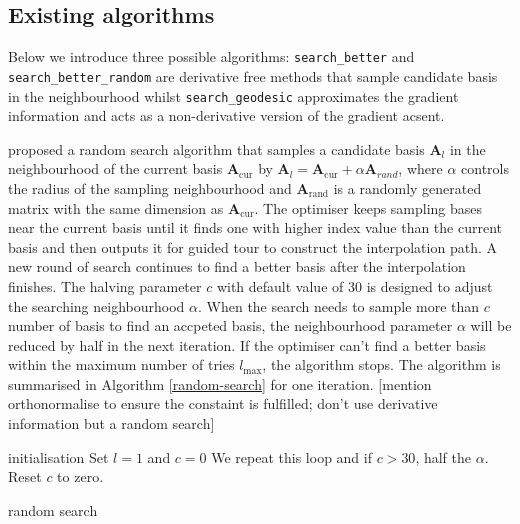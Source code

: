 \documentclass[12pt]{article}
\begin{document}
\newpage

\hypertarget{existing-algorithms}{%
\subsection{Existing algorithms}\label{existing-algorithms}}

Below we introduce three possible algorithms: \texttt{search\_better}
and \texttt{search\_better\_random} are derivative free methods that
sample candidate basis in the neighbourhood whilst
\texttt{search\_geodesic} approximates the gradient information and acts
as a non-derivative version of the gradient acsent.

\citet{posse1995projection} proposed a random search algorithm that
samples a candidate basis \(\mathbf{A}_{l}\) in the neighbourhood of the
current basis \(\mathbf{A}_{\text{cur}}\) by
\(\mathbf{A}_{l} = \mathbf{A}_{\text{cur}} + \alpha \mathbf{A}_{rand}\),
where \(\alpha\) controls the radius of the sampling neighbourhood and
\(\mathbf{A}_{\text{rand}}\) is a randomly generated matrix with the
same dimension as \(\mathbf{A}_{\text{cur}}\). The optimiser keeps
sampling bases near the current basis until it finds one with higher
index value than the current basis and then outputs it for guided tour
to construct the interpolation path. A new round of search continues to
find a better basis after the interpolation finishes. The halving
parameter \(c\) with default value of 30 is designed to adjust the
searching neighbourhood \(\alpha\). When the search needs to sample more
than \(c\) number of basis to find an accpeted basis, the neighbourhood
parameter \(\alpha\) will be reduced by half in the next iteration. If
the optimiser can't find a better basis within the maximum number of
tries \(l_{\max}\), the algorithm stops. The algorithm is summarised in
Algorithm \ref{random-search} for one iteration. {[}mention
orthonormalise to ensure the constaint is fulfilled; don't use
derivative information but a random search{]}

\begin{algorithm}
\SetAlgoLined
  initialisation\;
  Set $l = 1$ and $c = 0$\;
  We repeat this loop and if $c > 30$, half the $\alpha$. Reset $c$ to zero.
  \caption{random search}
  \label{random-search}
\end{algorithm}
\end{document}
